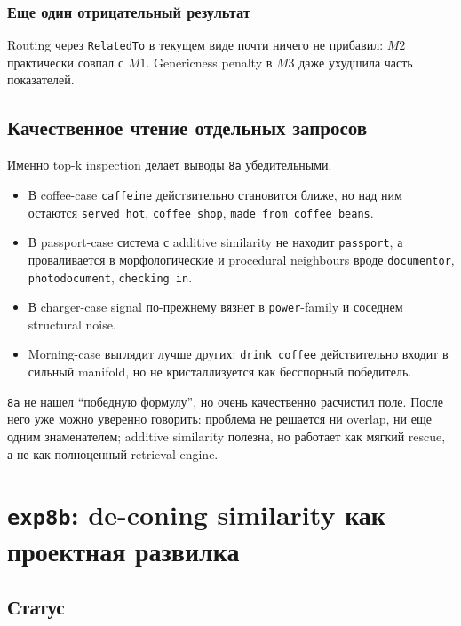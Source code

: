 \subsubsection*{Еще один отрицательный результат}

Routing через \texttt{RelatedTo} в текущем виде почти ничего не прибавил:
\(M2\) практически совпал с \(M1\). Genericness penalty в \(M3\) даже ухудшила
часть показателей.

\subsection{Качественное чтение отдельных запросов}

Именно top-k inspection делает выводы \texttt{8a} убедительными.

\begin{itemize}[leftmargin=2em]
\item В coffee-case \texttt{caffeine} действительно становится ближе, но над ним
остаются \texttt{served hot}, \texttt{coffee shop}, \texttt{made from coffee
beans}.
\item В passport-case система с additive similarity не находит \texttt{passport},
а проваливается в морфологические и procedural neighbours вроде
\texttt{documentor}, \texttt{photodocument}, \texttt{checking in}.
\item В charger-case signal по-прежнему вязнет в \texttt{power}-family и
соседнем structural noise.
\item Morning-case выглядит лучше других: \texttt{drink coffee} действительно
входит в сильный manifold, но не кристаллизуется как бесспорный победитель.
\end{itemize}

\begin{takeaway}
\texttt{8a} не нашел ``победную формулу'', но очень качественно расчистил поле.
После него уже можно уверенно говорить: проблема не решается ни overlap, ни еще
одним знаменателем; additive similarity полезна, но работает как мягкий rescue,
а не как полноценный retrieval engine.
\end{takeaway}

\section{\texttt{exp8b}: de-coning similarity как проектная развилка}

\subsection{Статус}

